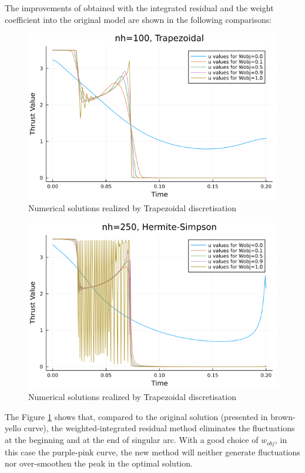 \documentclass{article}
\begin{document}
The improvements of obtained with the integrated residual and the weight coefficient into the original model are shown in the following comparisons:
\begin{figure}[ht]
    \centering
    \includegraphics[width = \textwidth]{obj_trap.png}
    \caption{\label{fig:obj_trap} Numerical solutions realized by Trapezoidal discretisation}
\end{figure}

\begin{figure}[ht]
    \centering
    \includegraphics[width = \textwidth]{obj_hersim.png}
    \caption{\label{fig:obj_hersim} Numerical solutions realized by Trapezoidal discretisation}
\end{figure}

The Figure \ref{fig:obj_trap} shows that, compared to the original solution (presented in brown-yello curve), the weighted-integrated residual method eliminates the fluctuations at the beginning and at the end of singular arc. With a good choice of $w_{obj}$, in this case the purple-pink curve, the new method will neither generate fluctuations nor over-smoothen the peak in the optimal solution.
\end{document}
